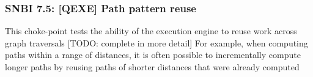\subsubsection{SNBI 7.5: [QEXE] Path pattern reuse}
\label{choke_point_7.5}
This choke-point tests the ability of the execution engine to reuse work across graph traversals [TODO: complete in more detail]
For example, when computing paths within a range of distances, it is often possible to incrementally compute longer paths by reusing paths of shorter distances that were already computed
